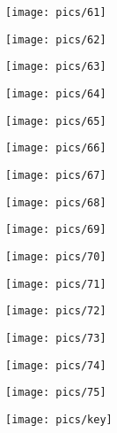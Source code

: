 \documentclass[a4paper,10pt]{article}
\begin{document}
\begin{center}
    \texttt{[image: pics/61]}
\vspace{1em}




    \texttt{[image: pics/62]}
\vspace{1em}




    \texttt{[image: pics/63]}
\vspace{1em}




    \texttt{[image: pics/64]}
\vspace{1em}




    \texttt{[image: pics/65]}
\vspace{1em}



    \texttt{[image: pics/66]}
\vspace{1em}



    \texttt{[image: pics/67]}
\vspace{1em}



    \texttt{[image: pics/68]}
\vspace{1em}



    \texttt{[image: pics/69]}
\vspace{1em}



    \texttt{[image: pics/70]}
\vspace{1em}




    \texttt{[image: pics/71]}
\vspace{1em}




    \texttt{[image: pics/72]}
\vspace{1em}




    \texttt{[image: pics/73]}
\vspace{1em}




    \texttt{[image: pics/74]}
\vspace{1em}




    \texttt{[image: pics/75]}
\vspace{1em}


    \texttt{[image: pics/key]}
    
    \label{pg_BF_keys_finish}

\end{center}
\end{document}
